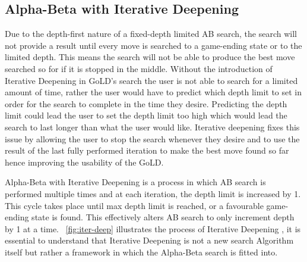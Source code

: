 \documentclass{l4proj}
\begin{document}
\subsection{Alpha-Beta with Iterative Deepening}

Due to the depth-first nature of a fixed-depth limited AB search, the search will not provide a result until every move is searched to a game-ending state or to the limited depth. This means the search will not be able to produce the best move searched so for if it is stopped in the middle. Without the introduction of Iterative Deepening in GoLD’s search the user is not able to search for a limited amount of time, rather the user would have to predict which depth limit to set in order for the search to complete in the time they desire. Predicting the depth limit could lead the user to set the depth limit too high which would lead the search to last longer than what the user would like. Iterative deepening fixes this issue by allowing the user to stop the search whenever they desire and to use the result of the last fully performed iteration to make the best move found so far hence improving the usability of the GoLD.

Alpha-Beta with Iterative Deepening is a process in which AB search is performed multiple times and at each iteration, the depth limit is increased by 1. This cycle takes place until max depth limit is reached, or a favourable game-ending state is found. This effectively alters AB search to only increment depth by 1 at a time.  ~\autoref{fig:iter-deep} illustrates the process of Iterative Deepening , it is essential to understand that Iterative Deepening is not a new search Algorithm itself but rather a framework in which the Alpha-Beta search is fitted into.
\end{document}
